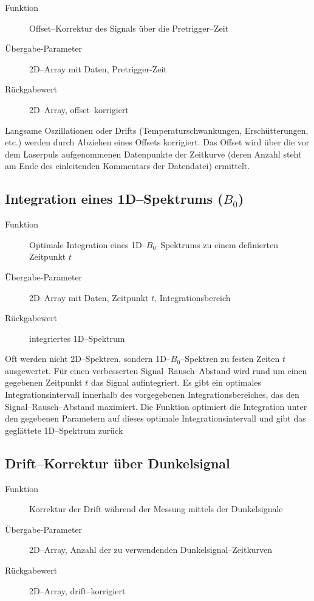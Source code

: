 \documentclass{article}
\begin{document}
\begin{description}
  \item[Funktion] Offset--Korrektur des Signals über die Pretrigger--Zeit
  \item[Übergabe-Parameter] 2D--Array mit Daten, Pretrigger-Zeit
  \item[Rückgabewert] 2D--Array, offset--korrigiert
\end{description}

Langsame Oszillationen oder Drifts (Temperaturschwankungen, Erschütterungen, etc.)
werden durch Abziehen eines Offsets korrigiert. Das Offset wird über die vor dem
Laserpuls aufgenommenen Datenpunkte der Zeitkurve (deren Anzahl steht am Ende
des einleitenden Kommentars der Datendatei) ermittelt.


\subsection{Integration eines 1D--Spektrums ($B_0$)}

\begin{description}
  \item[Funktion] Optimale Integration eines 1D--$B_0$--Spektrums zu einem
  definierten Zeitpunkt $t$
  \item[Übergabe-Parameter] 2D--Array mit Daten, Zeitpunkt $t$, Integrationsbereich
  \item[Rückgabewert] integriertes 1D--Spektrum
\end{description}

Oft werden nicht 2D--Spektren, sondern 1D--$B_0$--Spektren zu festen Zeiten $t$ 
ausgewertet. Für einen verbesserten Signal--Rausch--Abstand wird rund um einen 
gegebenen Zeitpunkt $t$ das Signal aufintegriert. Es gibt ein optimales 
Integrationsintervall innerhalb des vorgegebenen Integrationsbereiches, das den 
Signal--Rausch--Abstand maximiert. Die Funktion optimiert die Integration unter 
den gegebenen Parametern auf dieses optimale Integrationsintervall und gibt das 
geglättete 1D--Spektrum zurück


\subsection{Drift--Korrektur über Dunkelsignal}

\begin{description}
  \item[Funktion] Korrektur der Drift während der Messung mittels der Dunkelsignale
  \item[Übergabe-Parameter] 2D--Array, Anzahl der zu verwendenden 
  Dunkelsignal--Zeitkurven
  \item[Rückgabewert] 2D--Array, drift--korrigiert
\end{description}
\end{document}

